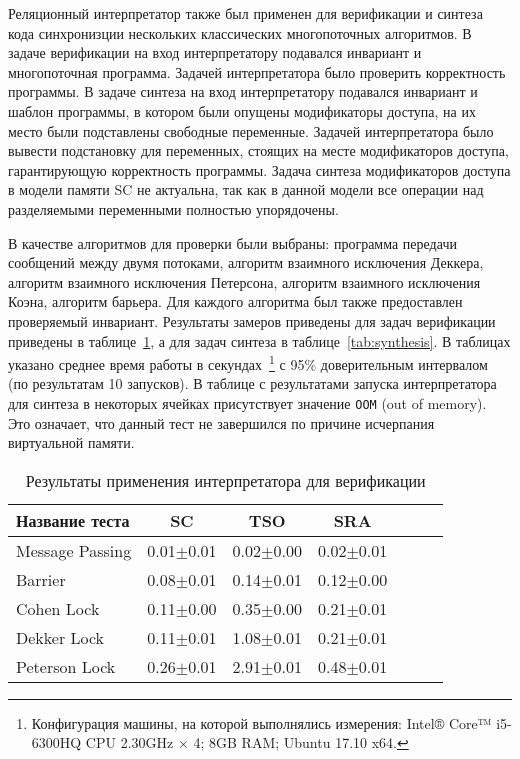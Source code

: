 Реляционный интерпретатор также был применен для верификации 
и синтеза кода синхронизции нескольких классических многопоточных алгоритмов.
В задаче верификации на вход интерпретатору подавался инвариант и многопоточная программа.
Задачей интерпретатора было проверить корректность программы. 
В задаче синтеза на вход интерпретатору подавался инвариант и шаблон программы,
в котором были опущены модификаторы доступа, 
на их место были подставлены свободные переменные.
Задачей интерпретатора было вывести подстановку для переменных,
стоящих на месте модификаторов доступа, 
гарантирующую корректность программы.
Задача синтеза модификаторов доступа в модели памяти SC не актуальна,
так как в данной модели все операции над разделяемыми переменными полностью упорядочены.

В качестве алгоритмов для проверки были выбраны:
программа передачи сообщений между двумя потоками,
алгоритм взаимного исключения Деккера, 
алгоритм взаимного исключения Петерсона, 
алгоритм взаимного исключения Коэна, 
алгоритм барьера.
Для каждого алгоритма был также предоставлен проверяемый инвариант.
Результаты замеров приведены для задач верификации приведены в таблице~\ref{tab:verification},
а для задач синтеза в таблице~\ref{tab:synthesis}.
В таблицах указано среднее время работы в секундах~\footnote{
Конфигурация машины, на которой выполнялись измерения: 
Intel® Core™ i5-6300HQ CPU 2.30GHz × 4; 8GB RAM; Ubuntu 17.10 x64.
} 
с 95\% доверительным интервалом
(по результатам 10 запусков).
В таблице с результатами запуска интерпретатора для синтеза в некоторых 
ячейках присутствует значение \texttt{OOM} (out of memory).
Это означает, что данный тест не завершился по причине 
исчерпания виртуальной памяти.

\begin{table}
\bgroup
\def\arraystretch{2}
\begin{center}
\begin{tabular}{| l | c | c | c | c | c | c |}
  \hline
  Название теста & SC & TSO & SRA                                                       \\ \hline
  Message Passing                       & 0.01$\pm$0.01 & 0.02$\pm$0.00 & 0.02$\pm$0.01       \\ \hline
  Barrier                               & 0.08$\pm$0.01 & 0.14$\pm$0.01 & 0.12$\pm$0.00       \\ \hline
  Cohen Lock                            & 0.11$\pm$0.00 & 0.35$\pm$0.00 & 0.21$\pm$0.01       \\ \hline
  Dekker Lock                           & 0.11$\pm$0.01 & 1.08$\pm$0.01 & 0.21$\pm$0.01       \\ \hline
  Peterson Lock                         & 0.26$\pm$0.01 & 2.91$\pm$0.01 & 0.48$\pm$0.01       \\ \hline
\end{tabular}
\end{center}
\caption{Результаты применения интерпретатора для верификации}
\label{tab:verification}
\egroup
\end{table}

